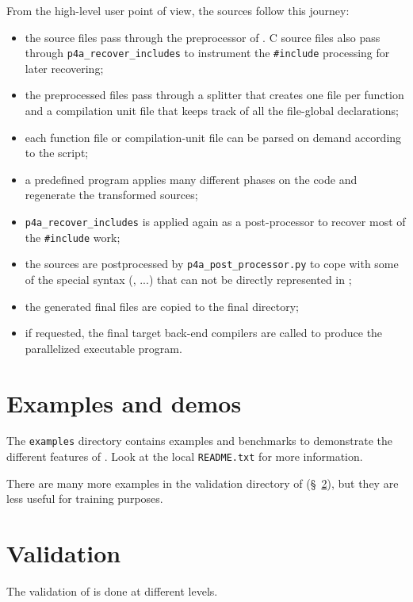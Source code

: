 \documentclass[a4paper]{article}
\begin{document}
From the high-level user point of view, the sources follow this journey:
\begin{itemize}
\item the source files pass through the preprocessor of
  \Apips. C source files also pass through
  \verb|p4a_recover_includes| to instrument the
  \verb|#include| processing for later recovering;
\item the preprocessed files pass through a splitter that creates
  one file per function and a compilation unit file that keeps track
  of all the file-global declarations;
\item each function file or compilation-unit file can be parsed on
  demand according to the \Apyps script;
\item a predefined \Apyps program applies many different \Apips phases on
  the code and regenerate the transformed sources;
\item \verb|p4a_recover_includes| is applied again as a post-processor
  to recover most of the \verb|#include| work;
\item the sources are postprocessed by
  \verb|p4a_post_processor.py| to cope with some of the special syntax
  (\Acuda, \Aopencl...) that can not be directly represented in \Apips;
\item the generated final files are copied to the final directory;
\item if requested, the final target back-end compilers are called to
  produce the parallelized executable program.
\end{itemize}



\section{Examples and demos}
\label{sec:examples-demos}

The \texttt{examples} directory contains examples and benchmarks to
demonstrate the different features of \Apfa. Look at the local
\texttt{README.txt} for more information.

There are many more examples in the validation directory of \Apfa
(\S~\ref{sec:validation}), but they are less useful for training purposes.


\section{Validation}
\label{sec:validation}

The validation of \Apfa is done at different levels.
\end{document}
